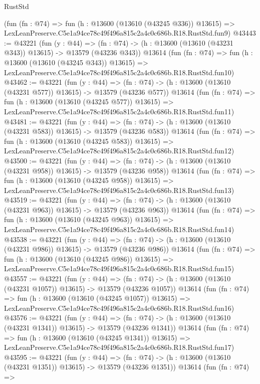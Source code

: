 \begin{lexlean}{RustStd}
\begin{coremodule}
    (fun (fn : @74) =>
    fun (h : @13600 (@13610 (@43245 @336)) @13615) =>
    LexLeanPreserve.C5e1a94ce78c49f496a815c2a4c0c686b.R18.RustStd.fun9)
@43443 := @43221
    (fun (y : @44) =>
    (fn : @74) -> (h : @13600 (@13610 (@43231 @343)) @13615) -> @13579 (@43236 @343))
    @13614
    (fun (fn : @74) =>
    fun (h : @13600 (@13610 (@43245 @343)) @13615) =>
    LexLeanPreserve.C5e1a94ce78c49f496a815c2a4c0c686b.R18.RustStd.fun10)
@43462 := @43221
    (fun (y : @44) =>
    (fn : @74) -> (h : @13600 (@13610 (@43231 @577)) @13615) -> @13579 (@43236 @577))
    @13614
    (fun (fn : @74) =>
    fun (h : @13600 (@13610 (@43245 @577)) @13615) =>
    LexLeanPreserve.C5e1a94ce78c49f496a815c2a4c0c686b.R18.RustStd.fun11)
@43481 := @43221
    (fun (y : @44) =>
    (fn : @74) -> (h : @13600 (@13610 (@43231 @583)) @13615) -> @13579 (@43236 @583))
    @13614
    (fun (fn : @74) =>
    fun (h : @13600 (@13610 (@43245 @583)) @13615) =>
    LexLeanPreserve.C5e1a94ce78c49f496a815c2a4c0c686b.R18.RustStd.fun12)
@43500 := @43221
    (fun (y : @44) =>
    (fn : @74) -> (h : @13600 (@13610 (@43231 @958)) @13615) -> @13579 (@43236 @958))
    @13614
    (fun (fn : @74) =>
    fun (h : @13600 (@13610 (@43245 @958)) @13615) =>
    LexLeanPreserve.C5e1a94ce78c49f496a815c2a4c0c686b.R18.RustStd.fun13)
@43519 := @43221
    (fun (y : @44) =>
    (fn : @74) -> (h : @13600 (@13610 (@43231 @963)) @13615) -> @13579 (@43236 @963))
    @13614
    (fun (fn : @74) =>
    fun (h : @13600 (@13610 (@43245 @963)) @13615) =>
    LexLeanPreserve.C5e1a94ce78c49f496a815c2a4c0c686b.R18.RustStd.fun14)
@43538 := @43221
    (fun (y : @44) =>
    (fn : @74) -> (h : @13600 (@13610 (@43231 @986)) @13615) -> @13579 (@43236 @986))
    @13614
    (fun (fn : @74) =>
    fun (h : @13600 (@13610 (@43245 @986)) @13615) =>
    LexLeanPreserve.C5e1a94ce78c49f496a815c2a4c0c686b.R18.RustStd.fun15)
@43557 := @43221
    (fun (y : @44) =>
    (fn : @74) -> (h : @13600 (@13610 (@43231 @1057)) @13615) -> @13579 (@43236 @1057))
    @13614
    (fun (fn : @74) =>
    fun (h : @13600 (@13610 (@43245 @1057)) @13615) =>
    LexLeanPreserve.C5e1a94ce78c49f496a815c2a4c0c686b.R18.RustStd.fun16)
@43576 := @43221
    (fun (y : @44) =>
    (fn : @74) -> (h : @13600 (@13610 (@43231 @1341)) @13615) -> @13579 (@43236 @1341))
    @13614
    (fun (fn : @74) =>
    fun (h : @13600 (@13610 (@43245 @1341)) @13615) =>
    LexLeanPreserve.C5e1a94ce78c49f496a815c2a4c0c686b.R18.RustStd.fun17)
@43595 := @43221
    (fun (y : @44) =>
    (fn : @74) -> (h : @13600 (@13610 (@43231 @1351)) @13615) -> @13579 (@43236 @1351))
    @13614
    (fun (fn : @74) =>

\end{coremodule}
\end{lexlean}
